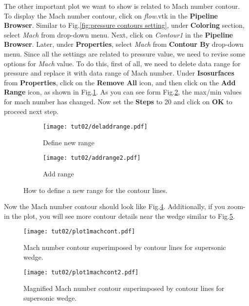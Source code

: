 The other important plot we want to show is related to Mach number contour. To display the Mach number contour, click on \textit{flow}.vtk in the \textbf{Pipeline Browser}. Similar to Fig.\ref{fig:pressure contours setting}, under \textbf{Coloring} section, select \textit{Mach} from drop-down menu. Next, click on \textit{Contour1} in the \textbf{Pipeline Browser}. Later, under \textbf{Properties}, select \textit{Mach} from \textbf{Contour By} drop-down menu. Since all the settings are related to pressure value, we need to revise some options for \textit{Mach} value. To do this, first of all, we need to delete data range for pressure and replace it with data range of Mach number. Under \textbf{Isosurfaces} from \textbf{Properties}, click on the \textbf{Remove All} icon, and then click on the \textbf{Add Range} icon, as shown in Fig.\ref{fig:contourby2 a}. As you can see form Fig.\ref{fig:contourby2 b}, the max/min values for mach number has changed. Now set the \textbf{Steps} to 20 and click on \textbf{OK} to proceed next step.
\begin{figure}[htbp]
    \centering
     \begin{subfigure}[b]{.4\textwidth}
         \centering
         \texttt{[image: tut02/deladdrange.pdf]}
         \caption{Define new range}
         \label{fig:contourby2 a}
     \end{subfigure}
     \hfill
     \begin{subfigure}[b]{.4\textwidth}
         \centering
         \texttt{[image: tut02/addrange2.pdf]}
         \caption{Add range}
         \label{fig:contourby2 b}
     \end{subfigure}     
    \caption{How to define a new range for the contour lines.}
    \label{fig:contourby2}
\end{figure}
Now the Mach number contour should look like Fig.\ref{fig:mach_contour}. Additionally, if you zoom-in the plot, you will see more contour details near the wedge similar to Fig.\ref{fig:mach_contour_zoom}.
\begin{figure}[htbp]
    \centering
    \texttt{[image: tut02/plot1machcont.pdf]}
    \caption{Mach number contour superimposed by contour lines for supersonic wedge.}
    \label{fig:mach_contour}
\end{figure}
\begin{figure}[htbp]
    \centering
    \texttt{[image: tut02/plot1machcont2.pdf]}
    \caption{Magnified Mach number contour superimposed by contour lines for supersonic wedge.}
    \label{fig:mach_contour_zoom}
\end{figure}
